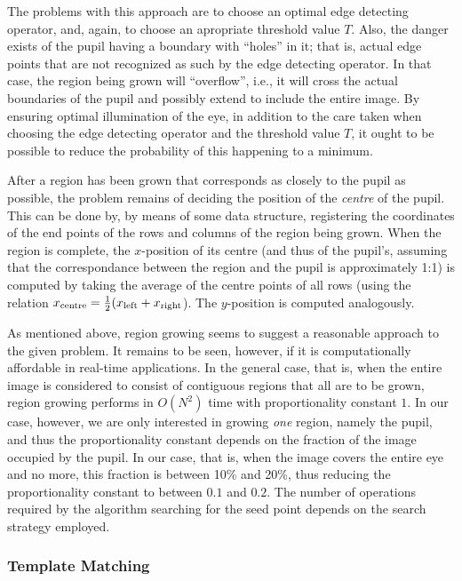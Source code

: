The problems with this approach are to choose an optimal edge
detecting operator, and, again, to choose an apropriate threshold
value $T$.  Also, the danger exists of the pupil having a boundary
with ``holes'' in it; that is, actual edge points that are not
recognized as such by the edge detecting operator.  In that case, the
region being grown will ``overflow'', i.e., it will cross the actual
boundaries of the pupil and possibly extend to include the entire
image.  By ensuring optimal illumination of the eye, in addition to
the care taken when choosing the edge detecting operator and the
threshold value $T$, it ought to be possible to reduce the probability
of this happening to a minimum.

After a region has been grown that corresponds as closely to the pupil
as possible, the problem remains of deciding the position of the {\em
  centre\/} of the pupil.  This can be done by, by means of some data
structure, registering the coordinates of the end points of the rows
and columns of the region being grown.  When the region is complete,
the $x$-position of its centre (and thus of the pupil's, assuming that
the correspondance between the region and the pupil is approximately
1:1) is computed by taking the average of the centre points of all
rows (using the relation $x_{\mbox{\scriptsize centre}}=\frac{1}{2}
(x_{\mbox{\scriptsize left}}+x_{\mbox{\scriptsize right}}$).  The
$y$-position is computed analogously.

As mentioned above, region growing seems to suggest a reasonable
approach to the given problem.  It remains to be seen, however, if it
is computationally affordable in real-time applications.  In the
general case, that is, when the entire image is considered to consist
of contiguous regions that all are to be grown, region growing
performs in $O(N^{2})$ time with proportionality constant $1$.  In our
case, however, we are only interested in growing {\em one\/} region,
namely the pupil, and thus the proportionality constant depends on the
fraction of the image occupied by the pupil.  In our case, that is,
when the image covers the entire eye and no more, this fraction is
between 10\% and 20\%, thus reducing the proportionality constant to
between $0.1$ and $0.2$.  The number of operations required by the
algorithm searching for the seed point depends on the search strategy
employed.

\subsubsection{Template Matching}

